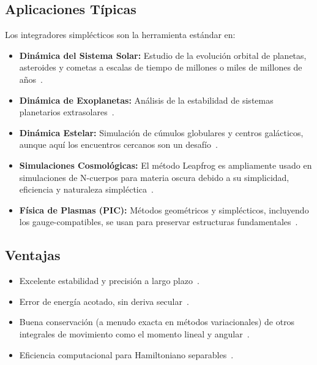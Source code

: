\subsection{Aplicaciones Típicas}
Los integradores simplécticos son la herramienta estándar en:
\begin{itemize}
    \item \textbf{Dinámica del Sistema Solar:} Estudio de la evolución orbital de planetas, asteroides y cometas a escalas de tiempo de millones o miles de millones de años~\cite{wisdom1991, yoshida1990}.
    \item \textbf{Dinámica de Exoplanetas:} Análisis de la estabilidad de sistemas planetarios extrasolares~\cite{rebound_doc}.
    \item \textbf{Dinámica Estelar:} Simulación de cúmulos globulares y centros galácticos, aunque aquí los encuentros cercanos son un desafío~\cite{hernandez2020, Hernandez2015}.
    \item \textbf{Simulaciones Cosmológicas:} El método Leapfrog es ampliamente usado en simulaciones de N-cuerpos para materia oscura debido a su simplicidad, eficiencia y naturaleza simpléctica~\cite{stuchi2002}.
    \item \textbf{Física de Plasmas (PIC):} Métodos geométricos y simplécticos, incluyendo los gauge-compatibles, se usan para preservar estructuras fundamentales~\cite{glasser2022}.
\end{itemize}

\subsection{Ventajas}
\begin{itemize}
    \item Excelente estabilidad y precisión a largo plazo~\cite{wisdom1991, yoshida1993}.
    \item Error de energía acotado, sin deriva secular~\cite{stuchi2002, farr2007}.
    \item Buena conservación (a menudo exacta en métodos variacionales) de otros integrales de movimiento como el momento lineal y angular~\cite{farr2007, Hernandez2015}.
    \item Eficiencia computacional para Hamiltoniano separables~\cite{wisdom1991}.
\end{itemize}

